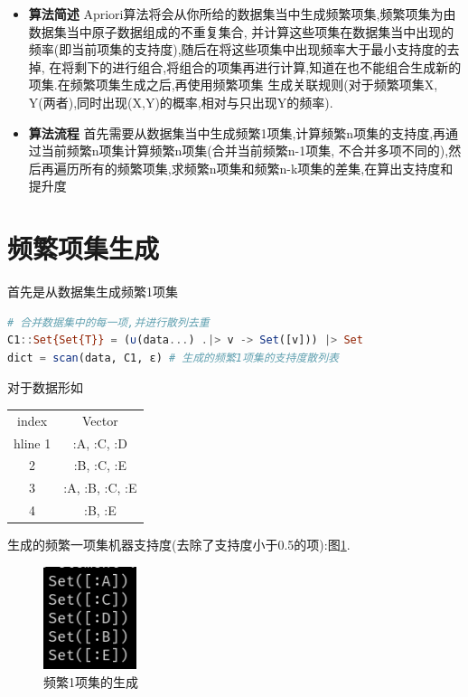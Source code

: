 \documentclass[a4paper]{article}
\begin{document}
\begin{itemize}
    \item {
          \textbf{算法简述}
          Apriori算法将会从你所给的数据集当中生成频繁项集,频繁项集为由数据集当中原子数据组成的不重复集合,
          并计算这些项集在数据集当中出现的频率(即当前项集的支持度),随后在将这些项集中出现频率大于最小支持度的去掉,
          在将剩下的进行组合,将组合的项集再进行计算,知道在也不能组合生成新的项集.在频繁项集生成之后,再使用频繁项集
          生成关联规则(对于频繁项集X, Y(两者),同时出现(X,Y)的概率,相对与只出现Y的频率).
          }
    \item {
          \textbf{算法流程}
          首先需要从数据集当中生成频繁1项集,计算频繁n项集的支持度,再通过当前频繁n项集计算频繁n项集(合并当前频繁n-1项集,
          不合并多项不同的),然后再遍历所有的频繁项集,求频繁n项集和频繁n-k项集的差集,在算出支持度和提升度
          }
\end{itemize}

\newpage

\section{频繁项集生成} \label{item set generate}

首先是从数据集生成频繁1项集

\begin{lstlisting}[language=julia]
# 合并数据集中的每一项,并进行散列去重
C1::Set{Set{T}} = (∪(data...) .|> v -> Set([v])) |> Set
dict = scan(data, C1, ε) # 生成的频繁1项集的支持度散列表
\end{lstlisting}

对于数据形如

\begin{table}[h]
    \centering
    \begin{tabular}{ |c|c| }
        index & Vector         \\hline
        1     & :A, :C, :D     \\
        2     & :B, :C, :E     \\
        3     & :A, :B, :C, :E \\
        4     & :B, :E         \\
    \end{tabular}
\end{table}

生成的频繁一项集机器支持度(去除了支持度小于0.5的项):图\ref{figure:item1set}.

\begin{figure}[h]
    \centering
    \label{figure:item1set}
    \includegraphics[height=3cm]{item1set.png}
    \caption{频繁1项集的生成}
\end{figure}
\end{document}
